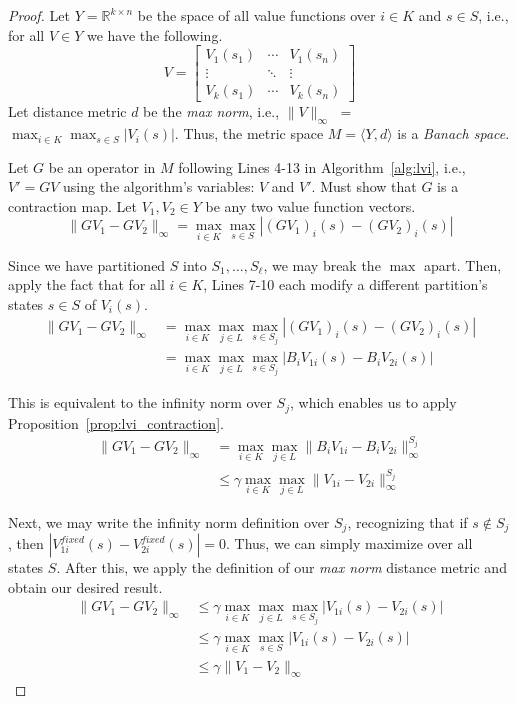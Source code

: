 \begin{proof}
Let $Y = \mathbb{R}^{k \times n}$ be the space of all value functions over $i \in K$ and $s \in S$, i.e., for all $V \in Y$ we have the following.
\begin{equation*}
    V = \begin{bmatrix}
            V_1(s_1) & \cdots & V_1(s_n) \\
            \vdots & \ddots & \vdots \\
            V_k(s_1) & \cdots & V_k(s_n)
        \end{bmatrix}
\end{equation*}
Let distance metric $d$ be the \emph{max norm}, i.e., $\|V\|_\infty$ $=$ $\max_{i \in K} \max_{s \in S} | V_i(s) |$. Thus, the metric space $M = \langle Y, d \rangle$ is a \emph{Banach space}.

Let $G$ be an operator in $M$ following Lines 4-13 in Algorithm~\ref{alg:lvi}, i.e., $V' = GV$ using the algorithm's variables: $V$ and $V'$. Must show that $G$ is a contraction map. Let $V_1, V_2 \in Y$ be any two value function vectors.
\begin{equation*}
    \| G V_1 - G V_2 \|_\infty = \max_{i \in K} \max_{s \in S} | (G V_1)_i (s) - (G V_2)_i (s) |
\end{equation*}

Since we have partitioned $S$ into $S_1, \ldots, S_\ell$, we may break the $\max$ apart. Then, apply the fact that for all $i \in K$, Lines 7-10 each modify a different partition's states $s \in S$ of $V_i(s)$.
\begin{align*}
    \| G V_1 - G V_2 \|_\infty &= \max_{i \in K} \max_{j \in L} \max_{s \in S_j} | (G V_1)_i (s) - (G V_2)_i (s) | \\
        &= \max_{i \in K} \max_{j \in L} \max_{s \in S_j} | B_i V_{1i} (s) - B_i V_{2i} (s) |
\end{align*}

This is equivalent to the infinity norm over $S_j$, which enables us to apply Proposition~\ref{prop:lvi_contraction}.
\begin{align*}
    \| G V_1 - G V_2 \|_\infty &= \max_{i \in K} \max_{j \in L} \| B_i V_{1i} - B_i V_{2i} \|_\infty^{S_j} \\
        &\leq \gamma \max_{i \in K} \max_{j \in L} \| V_{1i} - V_{2i} \|_\infty^{S_j}
\end{align*}

Next, we may write the infinity norm definition over $S_j$, recognizing that if $s \notin S_j$, then $| V_{1i}^{fixed}(s) - V_{2i}^{fixed}(s) | = 0$. Thus, we can simply maximize over all states $S$. After this, we apply the definition of our \emph{max norm} distance metric and obtain our desired result.
\begin{align*}
    \| G V_1 - G V_2 \|_\infty &\leq \gamma \max_{i \in K} \max_{j \in L} \max_{s \in S_j} | V_{1i}(s) - V_{2i}(s) | \\
        &\leq \gamma \max_{i \in K} \max_{s \in S} | V_{1i}(s) - V_{2i}(s) | \\
        &\leq \gamma \| V_1 - V_2 \|_\infty
\end{align*}


\end{proof}
